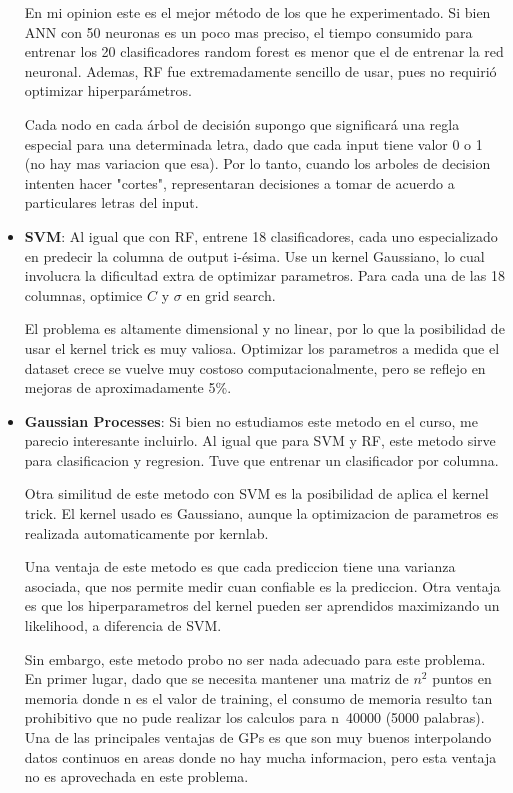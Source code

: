 \documentclass[paper=a4, fontsize=11pt]{scrartcl} %
\numberwithin{equation}{section} %
\numberwithin{figure}{section} %
\numberwithin{table}{section} %
\begin{document}
\begin{itemize}
En mi opinion este es el mejor método de los que he experimentado. Si bien ANN con 50 neuronas es un poco mas preciso, el tiempo consumido para entrenar los 20 clasificadores random forest es menor que el de entrenar la red neuronal. Ademas, RF fue extremadamente sencillo de usar, pues no requirió optimizar hiperparámetros.

Cada nodo en cada árbol de decisión supongo que significará una regla especial para una determinada letra, dado que cada input tiene valor 0 o 1 (no hay mas variacion que esa). Por lo tanto, cuando los arboles de decision intenten hacer "cortes", representaran decisiones a tomar de acuerdo a particulares letras del input.

\item \textbf{SVM}: Al igual que con RF, entrene 18 clasificadores, cada uno especializado en predecir la columna de output i-ésima. Use un kernel Gaussiano, lo cual involucra la dificultad extra de optimizar parametros. Para cada una de las 18 columnas, optimice $C$ y $\sigma$ en grid search.

El problema es altamente dimensional y no linear, por lo que la posibilidad de usar el kernel trick es muy valiosa. Optimizar los parametros a medida que el dataset crece se vuelve muy costoso computacionalmente, pero se reflejo en mejoras de aproximadamente 5\%.

\item \textbf{Gaussian Processes}: Si bien no estudiamos este metodo en el curso, me parecio interesante incluirlo\cite{gauss_processes}. Al igual que para SVM y RF, este metodo sirve para clasificacion y regresion. Tuve que entrenar un clasificador por columna. 

Otra similitud de este metodo con SVM es la posibilidad de aplica el kernel trick. El kernel usado es  Gaussiano, aunque la optimizacion de parametros es realizada automaticamente por kernlab.

Una ventaja de este metodo es que cada prediccion tiene una varianza asociada, que nos permite medir cuan confiable es la prediccion. Otra ventaja es que los hiperparametros del kernel pueden ser aprendidos maximizando un likelihood, a diferencia de SVM.

Sin embargo, este metodo probo no ser nada adecuado para este problema. En primer lugar, dado que se necesita mantener una matriz de $n^2$ puntos en memoria donde n es el valor de training, el consumo de memoria resulto tan prohibitivo que no pude realizar los calculos para n~40000 (5000 palabras). Una de las principales ventajas de GPs es que son muy buenos interpolando datos continuos en areas donde no hay mucha informacion, pero esta ventaja no es aprovechada en este problema.


\end{itemize}
\end{document}
